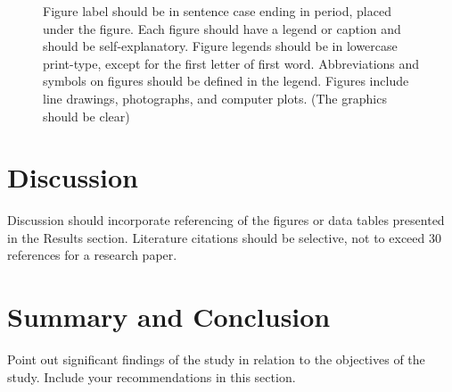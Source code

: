 \documentclass{strrespaper-journ}
\begin{document}
			\begin{figure}[htbp]
				\centering
				\caption{%
					Figure label should be in sentence case ending in period, placed under the figure.
					Each figure should have a legend or caption and should be self-explanatory.
					Figure legends should be in lowercase print-type, except for the first letter of first word.
					Abbreviations and symbols on figures should be defined in the legend.
					Figures include line drawings, photographs, and computer plots.
					(The graphics should be clear)%
				}
				\label{fig:bar_graph}
			\end{figure}

	\section{Discussion}
		Discussion should incorporate referencing of the figures or data tables presented in the Results section.
		Literature citations should be selective, not to exceed 30 references for a research paper.

	\section{Summary and Conclusion}
		Point out significant findings of the study in relation to the objectives of the study.
		Include your recommendations in this section.
\end{document}
